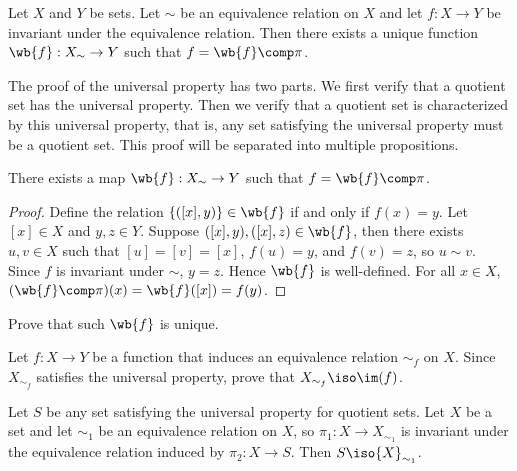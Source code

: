 \documentclass[10pt]{article}
\begin{document}
\begin{Universal property for quotient sets}
    Let $X$ and $Y$ be sets. Let $\sim$ be an equivalence relation on $X$ and let $f:X\to Y$ be invariant under the equivalence relation. Then there exists a unique function $\wb{f}:{X}_{\sim}\to Y$ such that $f=\wb{f}\comp\pi$.
\end{Universal property for quotient sets}
\begin{center}
\end{center}
\par
The proof of the universal property has two parts. We first verify that a quotient set has the universal property. Then we verify that a quotient set is characterized by this universal property, that is, any set satisfying the universal property must be a quotient set. This proof will be separated into multiple propositions.
\begin{proposition}
    There exists a map $\wb{f}:{X}_{\sim}\to Y$ such that $f=\wb{f}\comp\pi$.
\end{proposition}
\begin{proof}
    Define the relation $\{([x],y)\}\in\wb{f}$ if and only if $f(x)=y$. Let $[x]\in X$ and $y,z\in Y$. Suppose $([x],y),([x],z)\in\wb{f}$, then there exists $u,v\in X$ such that $[u]=[v]=[x]$, $f(u)=y$, and $f(v)=z$, so $u\sim v$. Since $f$ is invariant under $\sim$, $y=z$. Hence $\wb{f}$ is well-defined. For all $x\in X$, $(\wb{f}\comp\pi)(x)=\wb{f}([x])=f(y)$.
\end{proof}
\begin{problem}
    Prove that such $\wb{f}$ is unique.
\end{problem}
\begin{problem}
    Let $f:X\to Y$ be a function that induces an equivalence relation ${\sim_{f}}$ on $X$. Since ${X}_{{\sim}_{f}}$ satisfies the universal property, prove that ${X}_{{\sim}_{f}}\iso\im(f)$.
\end{problem}
\begin{proposition}
    Let $S$ be any set satisfying the universal property for quotient sets. Let $X$ be a set and let ${\sim}_{1}$ be an equivalence relation on $X$, so ${\pi}_{1}:X\to{X}_{{\sim}_{1}}$ is invariant under the equivalence relation induced by ${\pi}_{2}:X\to S$. Then $S\iso{X}_{{\sim}_{1}}$.
\end{proposition}
\end{document}
